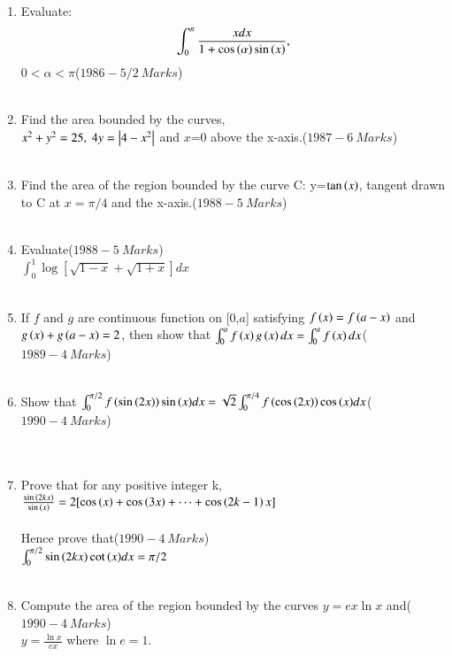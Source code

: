 \documentclass[journal,12pt,twocolumn]{IEEEtran}
\theoremstyle{remark}
\begin{document}
\begin{enumerate}
		     \item Evaluate:\begin{align*}
		         \int_{0}^{\pi}\frac{xdx}{1+\cos{\ensuremath{\left(\alpha\right)}}\sin{\ensuremath{\left(x\right)}}},
			 \end{align*}$0<\alpha<\pi$\hfill($1986-5/2\ Marks$)\\\\
			 \item Find the area bounded by the curves,\\ $x^2+y^2=25,\ 4y=\left\vert4-x^2\right\vert$ and $x$=0 above the x-axis.\hfill($1987-6\ Marks$)\\\\
			 \item Find the area of the region bounded by the curve C: y=$\tan{\ensuremath{\left(x\right)}}$, tangent drawn to C at $x=\pi/4$ and the x-axis.\hfill($1988-5\ Marks$)\\\\
			 \item Evaluate\hfill($1988-5\ Marks$)\\$\int_{0}^{1}\log[\sqrt{1-x}+\sqrt{1+x}]dx$\\\\
			 \item If $f$ and $g$ are continuous function on [0,$a$] satisfying $f\left(x\right)=f\left(a-x\right)$ and\\$g\left(x\right)+g\left(a-x\right)=2$, then show that $\int_{0}^{a}f\left(x\right)g\left(x\right)dx = \int_{0}^{a}f\left(x\right)dx$\hfill($1989-4\ Marks$)\\\\
			 \item Show that $\int_{0}^{\pi/2}f\left(\sin{\ensuremath{\left(2x\right)}}\right)\sin{\ensuremath{\left(x\right)}}dx=\sqrt{2}\int_{0}^{\pi/4}f\left(\cos{\ensuremath{\left(2x\right)}}\right)\cos{\ensuremath{\left(x\right)}}dx$\hfill($1990-4\ Marks$)\\\\\\
			 \item Prove that for any positive integer k, $\frac{\sin{\ensuremath{\left(2kx\right)}}}{\sin{\ensuremath{\left(x\right)}}}=2[\cos{\ensuremath{\left(x\right)}}+\cos{\ensuremath{\left(3x\right)}}+\dots+\cos{\ensuremath{\left(2k-1\right)}x}]$\\\\Hence prove that\hfill($1990-4\ Marks$)\\ $\int_{0}^{\pi/2}\sin{\ensuremath{\left(2kx\right)}}\cot{\ensuremath{\left(x\right)}}dx=\pi/2$\\\\
			 \item Compute the area of the region bounded by the curves $y=ex\ln{x}$ and\hfill($1990-4\ Marks$)\\$y=\frac{\ln{x}}{ex}$ where $\ln{e}=1$.\\\\
			 \end{enumerate}
			 
\end{document}
